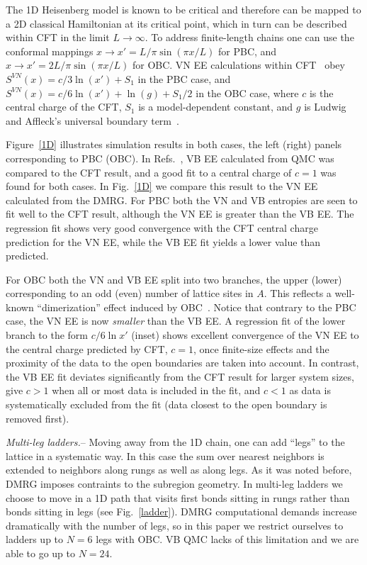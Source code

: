 \documentclass[prl,aps,twocolumn,floatfix,amsmath,amssymb,superscriptaddress,tightenlines]{revtex4}
\begin{document}
The 1D Heisenberg model is known to be critical and therefore can be
mapped to a 2D classical Hamiltonian at its critical point, which in turn
can be described within CFT in the limit $L\to\infty$.  To address
finite-length chains one can use the conformal mappings $x\to x'=L/\pi
\sin(\pi x / L)$ for PBC, and $x\to x'=2L/\pi \sin(\pi x / L)$ for OBC. VN
EE calculations within CFT~\cite{Cardy, Huanq2006} obey $S^{VN}(x)= c/3
\ln(x') + S_1$ in the PBC case, and $S^{VN}(x)= c/6 \ln(x') +
\ln(g)+S_1/2$ in the OBC case, where $c$ is the central charge of the CFT,
$S_1$ is a model-dependent constant, and $g$ is Ludwig and Affleck's
universal boundary term~\cite{AffleckAndLudwig}.

Figure~\ref{1D} illustrates simulation results in both cases, the left
(right) panels corresponding to PBC (OBC). In Refs.~\cite{Alet, Chh}, VB
EE calculated from QMC was compared to the CFT result, and a good fit to a
central charge of $c=1$ was found for both cases.  In Fig.~\ref{1D} we
compare this result to the VN EE calculated from the DMRG.  For PBC both
the VN and VB entropies are seen to fit well to the CFT result, although
the VN EE is greater than the VB EE. The regression fit shows very good
convergence with the CFT central charge prediction for the VN EE, while
the VB EE fit yields a lower value than predicted.  

For OBC both the VN and VB EE split into two branches, the upper (lower)
corresponding to an odd (even) number of lattice sites in $A$.  This
reflects a well-known ``dimerization'' effect induced by OBC~\cite{Ian1}.
Notice that contrary to the PBC case, the VN EE is now \textit{smaller}
than the VB EE. A regression fit of the lower branch to the form $c/6 \ln
{x'}$ (inset) shows excellent convergence of the VN EE to the central
charge predicted by CFT, $c=1$, once finite-size effects and the proximity
of the data to the open boundaries are taken into account.  In contrast,
the VB EE fit deviates significantly from the CFT result for larger system
sizes, give $c>1$ when all or most data is included in the fit, and $c<1$
as data is systematically excluded from the fit (data closest to the open
boundary is removed first).

{\it Multi-leg ladders.}-- Moving away from the 1D chain, one can add
``legs'' to the lattice in a systematic way. In this case the sum over
nearest neighbors is extended to neighbors along rungs as well as along
legs.  As it was noted before, DMRG imposes contraints to the subregion
geometry. In multi-leg ladders we choose to move in a 1D path that visits
first bonds sitting in rungs rather than bonds sitting in legs (see
Fig.~\ref{ladder}). 
DMRG computational demands increase dramatically with the number of legs,
so in this paper we restrict ourselves to ladders up to $N=6$ legs with
OBC. VB QMC lacks of this limitation and we are able to go up to $N=24$. 
\end{document}
